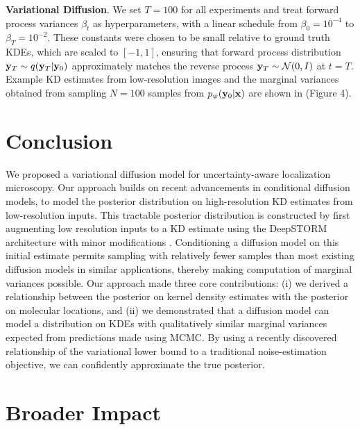 \documentclass{article}
\begin{document}
\textbf{Variational Diffusion}. We set $T = 100$ for all experiments and treat forward process variances $\beta_{t}$ as hyperparameters, with a linear schedule from $\beta_{0}=10^{-4}$ to $\beta_{T}=10^{-2}$.
These constants were chosen to be small relative to ground truth KDEs, which are scaled to $[-1,1]$, ensuring that forward process distribution $\bold{y}_{T}\sim q(\bold{y}_{T}|\bold{y}_{0})$ approximately matches the reverse process $\bold{y}_T\sim \mathcal{N}(0, I)$ at $t=T$. Example KD estimates from low-resolution images and the marginal variances obtained from sampling $N=100$ samples from $p_{\psi}(\bold{y}_{0}|\bold{x})$ are shown in (Figure 4). 


\section{Conclusion}

We proposed a variational diffusion model for uncertainty-aware localization microscopy. Our approach builds on recent advancements in conditional diffusion models, to model the posterior distribution on high-resolution KD estimates from low-resolution inputs. This tractable posterior distribution is constructed by first augmenting low resolution inputs to a KD estimate using the DeepSTORM architecture with minor modifications \citep{Nehme2020}. Conditioning a diffusion model on this initial estimate permits sampling with relatively fewer samples than most existing diffusion models in similar applications, thereby making computation of marginal variances possible. Our approach made three core contributions: (i) we derived a relationship between the posterior on kernel density estimates with the posterior on molecular locations, and (ii) we demonstrated that a diffusion model can model a distribution on KDEs with qualitatively similar marginal variances expected from predictions made using MCMC. By using a recently discovered relationship of the variational lower bound to a traditional noise-estimation objective, we can confidently approximate the true posterior.

\section{Broader Impact}
\end{document}

